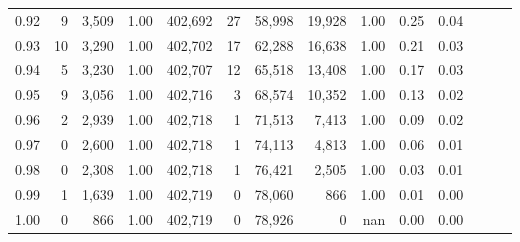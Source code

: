 \begin{tabular}{rrrrrrrrrrrrrr}
0.92 &      9 &  3,509 &  1.00 &  402,692 &       27 &  58,998 &  19,928 &  1.00 &  0.25 &      0.04 \\
0.93 &     10 &  3,290 &  1.00 &  402,702 &       17 &  62,288 &  16,638 &  1.00 &  0.21 &      0.03 \\
0.94 &      5 &  3,230 &  1.00 &  402,707 &       12 &  65,518 &  13,408 &  1.00 &  0.17 &      0.03 \\
0.95 &      9 &  3,056 &  1.00 &  402,716 &        3 &  68,574 &  10,352 &  1.00 &  0.13 &      0.02 \\
0.96 &      2 &  2,939 &  1.00 &  402,718 &        1 &  71,513 &   7,413 &  1.00 &  0.09 &      0.02 \\
0.97 &      0 &  2,600 &  1.00 &  402,718 &        1 &  74,113 &   4,813 &  1.00 &  0.06 &      0.01 \\
0.98 &      0 &  2,308 &  1.00 &  402,718 &        1 &  76,421 &   2,505 &  1.00 &  0.03 &      0.01 \\
0.99 &      1 &  1,639 &  1.00 &  402,719 &        0 &  78,060 &     866 &  1.00 &  0.01 &      0.00 \\
1.00 &      0 &    866 &  1.00 &  402,719 &        0 &  78,926 &       0 &   nan &  0.00 &      0.00 \\
\bottomrule
\end{tabular}
